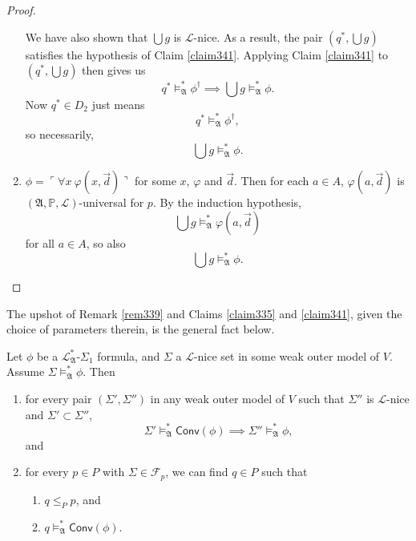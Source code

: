 \documentclass[12pt]{article}
\numberwithin{equation}{section}
\begin{document}
\begin{proof}
\begin{enumerate}[label=Case \arabic*:, leftmargin=50pt]
    We have also shown that $\bigcup g$ is $\mathcal{L}$-nice. As a result, the pair $(q^*, \bigcup g)$ satisfies the hypothesis of Claim \ref{claim341}. Applying Claim \ref{claim341} to $(q^*, \bigcup g)$ then gives us
    \begin{equation*}
        q^* \models^{*}_{\mathfrak{A}} \phi^{\dagger} \implies \bigcup g \models^{*}_{\mathfrak{A}} \phi \text{.}
    \end{equation*}
    Now $q^* \in D_2$ just means $$q^* \models^{*}_{\mathfrak{A}} \phi^{\dagger},$$ so necessarily, 
    \begin{equation*}
        \bigcup g \models^{*}_{\mathfrak{A}} \phi \text{.}
    \end{equation*}
    
    \item $\phi = \ulcorner \forall x \ \varphi(x, \Vec{d}) \urcorner$ for some $x$, $\varphi$ and $\Vec{d}$. Then for each $a \in A$, $\varphi(a, \Vec{d})$ is $(\mathfrak{A}, \mathbb{P}, \mathcal{L})$-universal for $p$. By the induction hypothesis, $$\bigcup g \models^{*}_{\mathfrak{A}} \varphi(a, \Vec{d})$$ for all $a \in A$, so also $$\bigcup g \models^{*}_{\mathfrak{A}} \phi.$$ \qedhere
\end{enumerate}
\end{proof}

The upshot of Remark \ref{rem339} and Claims \ref{claim335} and \ref{claim341}, given the choice of parameters therein, is the general fact below. 

\begin{fact}\label{fact336}
Let $\phi$ be a $\mathcal{L}^{*}_{\mathfrak{A}}$-$\Sigma_1$ formula, and $\Sigma$ a $\mathcal{L}$-nice set in some weak outer model of $V$.
Assume $\Sigma \models^{*}_{\mathfrak{A}} \phi$. Then
\begin{enumerate}[label=(\arabic*)]
    \item\label{3363} for every pair $(\Sigma', \Sigma'')$ in any weak outer model of $V$ such that $\Sigma''$ is $\mathcal{L}$-nice and $\Sigma' \subset \Sigma''$,
    \begin{equation*}
        \Sigma' \models^{*}_{\mathfrak{A}} \mathsf{Conv}(\phi) \implies \Sigma'' \models^{*}_{\mathfrak{A}} \phi \text{,}
    \end{equation*}
    and
    \item\label{3361} for every $p \in P$ with $\Sigma \in \mathcal{F}_p$, we can find $q \in P$ such that
    \begin{enumerate}[label=(\alph*)]
        \item $q \leq_P p$, and
        \item\label{3362} $q \models^{*}_{\mathfrak{A}} \mathsf{Conv}(\phi)$. 
    \end{enumerate}
\end{enumerate}
\end{fact}
\end{document}
